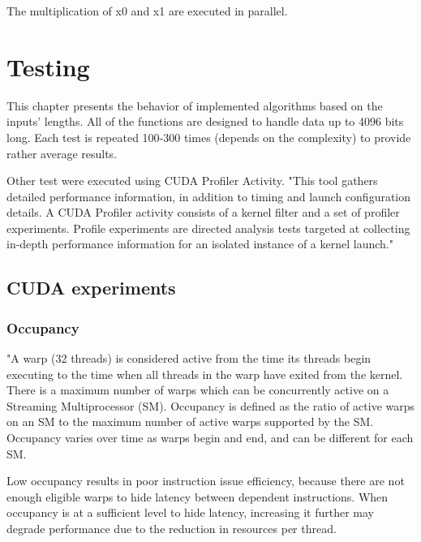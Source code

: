 \documentclass[oneside,openright,12pt,final,en]{mgr}
\begin{document}
The multiplication of x0 and x1 are executed in parallel.



\chapter{Testing}
This chapter presents the behavior of implemented algorithms based on the inputs' lengths. All of the functions are designed to handle data up to 4096 bits long. Each test is repeated 100-300 times (depends on the complexity) to provide rather average results.  


Other test were executed using CUDA Profiler Activity. "This tool gathers detailed performance information, in addition to timing and launch configuration details. A CUDA Profiler activity consists of a kernel filter and a set of profiler experiments. Profile experiments are directed analysis tests targeted at collecting in-depth performance information for an isolated instance of a kernel launch."\cite{nsight}

\section{CUDA experiments}

\subsection{Occupancy}
"A warp (32 threads) is considered active from the time its threads begin executing to the time when all threads in the warp have exited from the kernel. There is a maximum number of warps which can be concurrently active on a Streaming Multiprocessor (SM). Occupancy is defined as the ratio of active warps on an SM to the maximum number of active warps supported by the SM. Occupancy varies over time as warps begin and end, and can be different for each SM.

Low occupancy results in poor instruction issue efficiency, because there are not enough eligible warps to hide latency between dependent instructions. When occupancy is at a sufficient level to hide latency, increasing it further may degrade performance due to the reduction in resources per thread.
\end{document}
